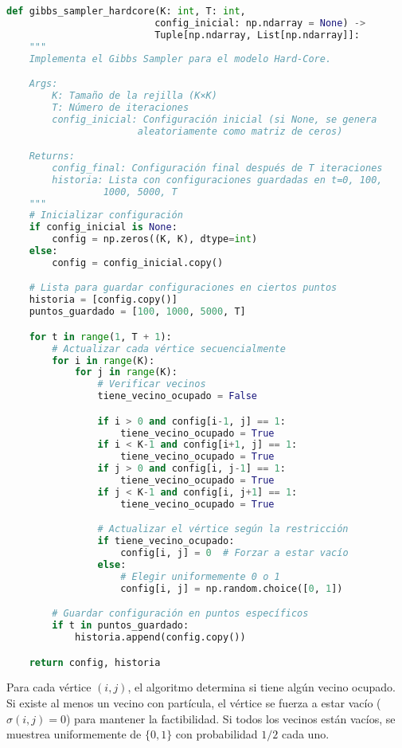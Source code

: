 \begin{lstlisting}[language=Python]
def gibbs_sampler_hardcore(K: int, T: int,
                          config_inicial: np.ndarray = None) ->
                          Tuple[np.ndarray, List[np.ndarray]]:
    """
    Implementa el Gibbs Sampler para el modelo Hard-Core.

    Args:
        K: Tamaño de la rejilla (K×K)
        T: Número de iteraciones
        config_inicial: Configuración inicial (si None, se genera
                       aleatoriamente como matriz de ceros)

    Returns:
        config_final: Configuración final después de T iteraciones
        historia: Lista con configuraciones guardadas en t=0, 100,
                 1000, 5000, T
    """
    # Inicializar configuración
    if config_inicial is None:
        config = np.zeros((K, K), dtype=int)
    else:
        config = config_inicial.copy()

    # Lista para guardar configuraciones en ciertos puntos
    historia = [config.copy()]
    puntos_guardado = [100, 1000, 5000, T]

    for t in range(1, T + 1):
        # Actualizar cada vértice secuencialmente
        for i in range(K):
            for j in range(K):
                # Verificar vecinos
                tiene_vecino_ocupado = False

                if i > 0 and config[i-1, j] == 1:
                    tiene_vecino_ocupado = True
                if i < K-1 and config[i+1, j] == 1:
                    tiene_vecino_ocupado = True
                if j > 0 and config[i, j-1] == 1:
                    tiene_vecino_ocupado = True
                if j < K-1 and config[i, j+1] == 1:
                    tiene_vecino_ocupado = True

                # Actualizar el vértice según la restricción
                if tiene_vecino_ocupado:
                    config[i, j] = 0  # Forzar a estar vacío
                else:
                    # Elegir uniformemente 0 o 1
                    config[i, j] = np.random.choice([0, 1])

        # Guardar configuración en puntos específicos
        if t in puntos_guardado:
            historia.append(config.copy())

    return config, historia
\end{lstlisting}

Para cada vértice $(i,j)$, el algoritmo determina si tiene algún vecino ocupado. Si existe al menos un vecino con partícula, el vértice se fuerza a estar vacío ($\sigma(i,j) = 0$) para mantener la factibilidad. Si todos los vecinos están vacíos, se muestrea uniformemente de $\{0, 1\}$ con probabilidad $1/2$ cada uno.

